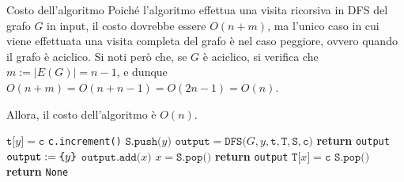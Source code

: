 \documentclass[a4paper, 12pt]{report}
\begin{document}
    \begin{framedobs}{Costo dell'algoritmo}
        Poiché l'algoritmo effettua una visita ricorsiva in DFS del grafo $G$ in input, il costo dovrebbe essere $O(n + m)$, ma l'unico caso in cui viene effettuata una visita completa del grafo è nel caso peggiore, ovvero quando il grafo è aciclico. Si noti però che, se $G$ è aciclico, si verifica che $m := |E(G)| = n - 1$, e dunque $O(n + m) = O(n + n - 1) = O(2n - 1) = O(n)$.

        Allora, il costo dell'algoritmo è $O(n)$.
    \end{framedobs}

    \begin{algorithm}[H]
        \caption{
            Dato un grafo diretto $G$, rappresentato attraverso liste di adiacenza, l'algoritmo restituisce un suo ciclo, se presente.\\
            \textbf{Input}: $G$ grafo diretto, rappresentato attraverso liste di adiacenza.\\
            \textbf{Output}: un ciclo di $G$, se presente.
        }

        \begin{algorithmic}[1]
            \label{findCycleDir}
                        \State $\texttt{t[}y\texttt{]} = \texttt{c}$
                        \State \texttt{c.increment()}
                        \State $\texttt{S.push(}y\texttt{)}$
                        \State $\texttt{output} = \texttt{DFS(}G, y, \texttt{t}, \texttt{T}, \texttt{S}, \texttt{c)}$
                            \State \textbf{return} \texttt{output}
                        \EndIf
                        \State $\texttt{output} := \verb|{| y \verb|}|$ 
                            \State $\texttt{output.add(}x\texttt{)}$
                            \State $x = \texttt{S.pop()}$
                        \EndWhile
                        \State \textbf{return} \texttt{output}
                    \EndIf
                \EndFor
                \State $\texttt{T[}x\texttt{]} = \texttt{c}$
                \State $\texttt{S.pop()}$
                \State \textbf{return} \texttt{None}
            \EndFunction
        \end{algorithmic}
    \end{algorithm}
\end{document}
